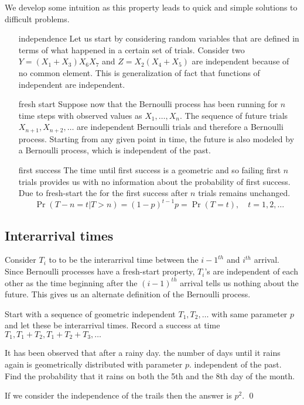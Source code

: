We develop some intuition as this property leads to quick and simple solutions to difficult problems. 
\begin{itemize}
    \item [independence] Let us start by considering random variables that are defined in terms of what happened in a certain set of trials. Consider two \rv $Y=(X_1+X_3)X_6X_7$ and $Z=X_2(X_4+X_5)$ are independent because of no common element. This is generalization of fact that functions of independent \rv are independent.
    \item [fresh start] Suppose now that the Bernoulli process has been running for $n$ time steps with observed values as $X_1,\ldots,X_n$. The sequence of future trials $X_{n+1},X_{n+2},\ldots$ are independent Bernoulli trials and therefore a Bernoulli process. Starting from any given point in time, the future is also modeled by a Bernoulli process, which is independent of the past.
    \item [first success] The time until first success is a geometric \rv and so failing first $n$ trials provides us with no information about the probability of first success. Due to fresh-start the \rv for the first success after $n$ trials remains unchanged.
    \[
        \Pr(T-n=t|T>n)=(1-p)^{t-1}p=\Pr(T=t), \quad t=1,2,\ldots
    \]
\end{itemize}

\subsection{Interarrival times}
Consider $T_i$ to to be the interarrival time between the $i-1^{th}$ and $i^{th}$ arrival. Since Bernoulli processes have a fresh-start property, $T_i$'s are independent of each other as the time beginning after the $(i-1)^{th}$ arrival tells us nothing about the future. This gives us an alternate definition of the Bernoulli process.

\begin{definition}
    Start with a sequence of geometric independent \rv $T_1, T_2,\ldots$ with same parameter $p$ and let these be interarrival times. Record a success at time $T_1, T_1+T_2, T_1+T_2+T_3, \ldots$
\end{definition}

\begin{example}
    It has been observed that after a rainy day. the  number of days until it rains again is geometrically distributed with parameter $p$. independent of the past. Find the probability that it rains on both the 5th and the 8th day of the month.

    If we consider the independence of the trails then the answer is $p^2$. \qed
\end{example}

